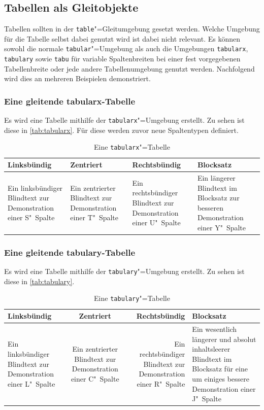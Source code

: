 \documentclass[english,ngerman]{tudscrreprt}
\begin{document}
\subsection{Tabellen als Gleitobjekte}
Tabellen sollten in der \texttt{table}"=Gleitumgebung gesetzt werden.
Welche Umgebung für die Tabelle selbst dabei genutzt wird ist dabei
nicht relevant. Es können sowohl die normale \texttt{tabular}"=Umgebung
als auch die Umgebungen \texttt{tabularx}, \texttt{tabulary} sowie
\texttt{tabu} für variable Spaltenbreiten bei einer fest vorgegebenen
Tabellenbreite oder jede andere Tabellenumgebung genutzt werden.
Nachfolgend wird dies an mehreren Beispielen demonstriert.

\subsubsection{Eine gleitende tabularx-Tabelle}
Es wird eine Tabelle mithilfe der \texttt{tabularx}"=Umgebung erstellt.
Zu sehen ist diese in \autoref{tab:tabularx}. Für diese werden zuvor
neue Spaltentypen definiert.


\begin{table}
\begin{tabularx}{\textwidth}{@{}DEFY@{}}
\toprule
\textbf{Linksbündig} & \textbf{Zentriert} &
\textbf{Rechtsbündig} & \textbf{Blocksatz} \tabularnewline
\midrule
Ein linksbündiger Blindtext zur Demonstration einer S"~Spalte &
Ein zentrierter Blindtext zur Demonstration einer T"~Spalte &
Ein rechtsbündiger Blindtext zur Demonstration einer U"~Spalte &
Ein längerer Blindtext im Blocksatz zur besseren Demonstration
einer Y"~Spalte\tabularnewline
\bottomrule
\end{tabularx}
\caption{Eine \texttt{tabularx}"=Tabelle}\label{tab:tabularx}
\end{table}

\subsubsection{Eine gleitende tabulary-Tabelle}
Es wird eine Tabelle mithilfe der \texttt{tabulary}"=Umgebung erstellt.
Zu sehen ist diese in \autoref{tab:tabulary}.

\begin{table}
\begin{tabulary}{\textwidth}{@{}LCRJ@{}}
\toprule
\textbf{Linksbündig} & \textbf{Zentriert} &
\textbf{Rechtsbündig} & \textbf{Blocksatz} \tabularnewline\midrule
Ein linksbündiger Blindtext zur Demonstration einer L"~Spalte &
Ein zentrierter Blindtext zur Demonstration einer C"~Spalte &
Ein rechtsbündiger Blindtext zur Demonstration einer R"~Spalte &
Ein wesentlich längerer und absolut inhaltsleerer Blindtext im
Blocksatz für eine um einiges bessere Demonstration einer J"~Spalte
\tabularnewline\bottomrule
\end{tabulary}
\caption{Eine \texttt{tabulary}"=Tabelle}\label{tab:tabulary}
\end{table}
\end{document}
